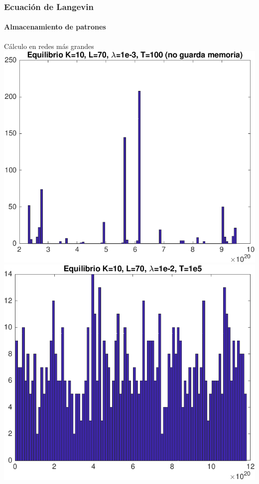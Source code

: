 \documentclass[11pt]{beamer}
\begin{document}
\begin{frame}
\frametitle{Ecuación de Langevin}
\framesubtitle{Almacenamiento de patrones}
\begin{center}
    Cálculo en redes más grandes\\
	\includegraphics[scale=0.45]{k10l70lambda3t100.png}
	\includegraphics[scale=0.45]{k10l70lambda2t1e5.png}
\end{center}
 
	

\end{frame}
\end{document}
